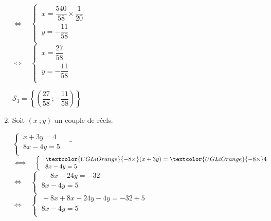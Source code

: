 \documentclass[a4paper,11pt,exos]{nsi} %
\begin{document}
\begin{enumerate}
\begin{tabbing}
            \>  $\iff\quad \left\{
                \begin{array}{l}
                \ x=\dfrac{540}{58}\times \dfrac{1}{20} \\[.5em]
                \ y=-\dfrac{11}{58}\\
            \end{array} \right.$\\[.5em]

            \>  $\iff\quad \left\{
                \begin{array}{l}
                \ x=\dfrac{27}{58} \\[.5em]
                \ y=-\dfrac{11}{58}\\
            \end{array} \right.$\\[.5em]
        \end{tabbing}
        $\mathcal{S}_3=\left\{\left(\dfrac{27}{58}\ ;-\dfrac{11}{58}\right)\right\}$

        \item Soit $(x\ ;y)$ un couple de réels.
        \begin{tabbing}
            $\left\{
                \begin{array}{l}
                    \ x+3y=4 \\
                    \ 8x-4y=5\\
                \end{array} \right. \quad$  \= $\iff\quad 
                \left\{
                    \begin{array}{l}
                    \ \textcolor{UGLiOrange}{-8\times}(x+3y)=\textcolor{UGLiOrange}{-8\times}4\\
                    \ 8x-4y=5\\
                \end{array} \right.$\\[.5em]
    
                \>  $\iff\quad \left\{
                    \begin{array}{l}
                    \ -8x-24y=-32 \\
                    \ 8x-4y=5\\
                \end{array} \right.$\\[.5em]

                \>  $\iff\quad \left\{
                    \begin{array}{l}
                    \ -8x+8x-24y-4y=-32+5 \\
                    \ 8x-4y=5\\
                \end{array} \right.$\\[.5em]


\end{tabbing}
\end{enumerate}
\end{document}
